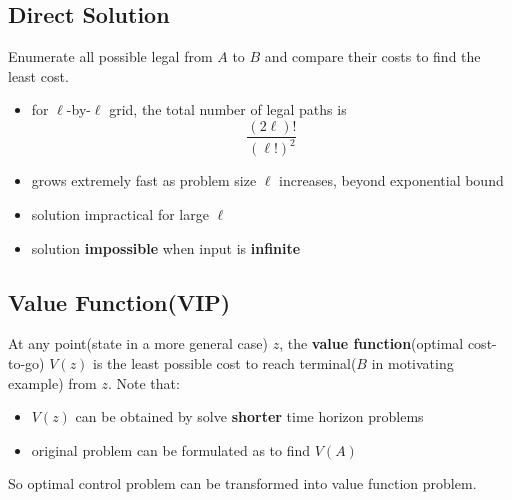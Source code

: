 \documentclass[10pt,a4paper,oneside]{article}
\begin{document}
\subsection{Direct Solution}
Enumerate all possible legal from $A$ to $B$ and compare their costs to find the least cost.
\begin{itemize}
	\item for $\ell$-by-$\ell$ grid, the total number of legal paths is
	$$
	\frac{(2 \ell) !}{(\ell !)^{2}}
	$$
	\item grows extremely fast as problem size $\ell$ increases, beyond exponential bound
	\item solution impractical for large $\ell$
	\item solution \textbf{impossible} when input is \textbf{infinite}
\end{itemize}

\subsection{Value Function(VIP)}
At any point(state in a more general case) $z$, the \textbf{value function}(optimal cost-to-go) $V(z)$ is the least possible cost to reach terminal($B$ in motivating example) from $z$. Note that:
\begin{itemize}
	\item $V(z)$ can be obtained by solve \textbf{shorter} time horizon problems
	\item original problem can be formulated as to find $V(A)$
\end{itemize}
So optimal control problem can be transformed into value function problem.
\end{document}
